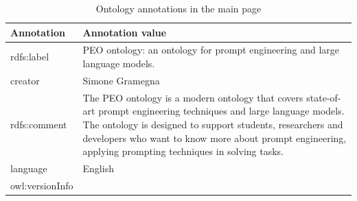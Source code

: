 \begin{table}[H]
    \centering
    \begin{tabular}{|>{\raggedright\arraybackslash}p{6cm}|>{\raggedright\arraybackslash}p{6cm}|}
        \hline
        \textbf{Annotation} & \textbf{Annotation value} \\ \hline
         rdfs:label & PEO ontology: an ontology for prompt 
         engineering and large language models. \\ \hline
         
         creator & Simone Gramegna\\ \hline
         
         rdfs:comment & The PEO ontology is a modern ontology that covers state-of-art prompt engineering techniques and large language models. The ontology is designed to support students, researchers and developers who want to know more about prompt engineering, applying prompting techniques in solving tasks. \\ \hline
         
         language & English \\ \hline
         
         owl:versionInfo & 1.0 \\ \hline
    \end{tabular}
    \caption{Ontology annotations in the main page}
\end{table}

